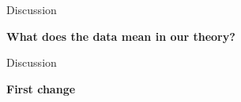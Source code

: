 \documentclass[lesson_slides]{subfiles}
\begin{document}
\begin{frame}[c]{Discussion}

\begin{center}
    \textbf{What does the data mean in our theory?}
\end{center}
  
\end{frame}
\begin{frame}[c]{Discussion}
    
\begin{center}
    \textbf{First change}
\end{center}
  
\end{frame}
\end{document}
